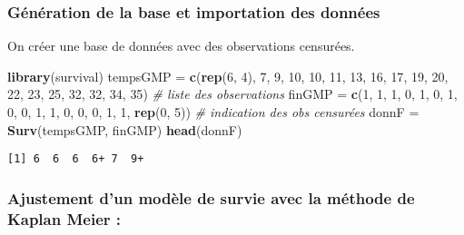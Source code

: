 \documentclass[
]{article}
\newenvironment{Shaded}{\begin{snugshade}}{\end{snugshade}}
\newcommand{\CommentTok}[1]{\textcolor[rgb]{0.56,0.35,0.01}{\textit{#1}}}
\newcommand{\DecValTok}[1]{\textcolor[rgb]{0.00,0.00,0.81}{#1}}
\newcommand{\FunctionTok}[1]{\textcolor[rgb]{0.13,0.29,0.53}{\textbf{#1}}}
\newcommand{\NormalTok}[1]{#1}
\newcommand{\OtherTok}[1]{\textcolor[rgb]{0.56,0.35,0.01}{#1}}
\begin{document}
\hypertarget{guxe9nuxe9ration-de-la-base-et-importation-des-donnuxe9es}{%
\subsubsection{Génération de la base et importation des
données}\label{guxe9nuxe9ration-de-la-base-et-importation-des-donnuxe9es}}

On créer une base de données avec des observations censurées.

\begin{Shaded}
\begin{Highlighting}[]
\FunctionTok{library}\NormalTok{(survival)}
\NormalTok{tempsGMP }\OtherTok{=} \FunctionTok{c}\NormalTok{(}\FunctionTok{rep}\NormalTok{(}\DecValTok{6}\NormalTok{, }\DecValTok{4}\NormalTok{), }\DecValTok{7}\NormalTok{, }\DecValTok{9}\NormalTok{, }\DecValTok{10}\NormalTok{, }\DecValTok{10}\NormalTok{, }\DecValTok{11}\NormalTok{, }\DecValTok{13}\NormalTok{, }\DecValTok{16}\NormalTok{, }\DecValTok{17}\NormalTok{, }\DecValTok{19}\NormalTok{, }\DecValTok{20}\NormalTok{, }\DecValTok{22}\NormalTok{, }\DecValTok{23}\NormalTok{, }\DecValTok{25}\NormalTok{, }\DecValTok{32}\NormalTok{, }
             \DecValTok{32}\NormalTok{, }\DecValTok{34}\NormalTok{, }\DecValTok{35}\NormalTok{) }\CommentTok{\# liste des observations}
\NormalTok{finGMP }\OtherTok{=} \FunctionTok{c}\NormalTok{(}\DecValTok{1}\NormalTok{, }\DecValTok{1}\NormalTok{, }\DecValTok{1}\NormalTok{, }\DecValTok{0}\NormalTok{, }\DecValTok{1}\NormalTok{, }\DecValTok{0}\NormalTok{, }\DecValTok{1}\NormalTok{, }\DecValTok{0}\NormalTok{, }\DecValTok{0}\NormalTok{, }\DecValTok{1}\NormalTok{, }\DecValTok{1}\NormalTok{, }\DecValTok{0}\NormalTok{, }\DecValTok{0}\NormalTok{, }\DecValTok{0}\NormalTok{, }\DecValTok{1}\NormalTok{, }\DecValTok{1}\NormalTok{, }\FunctionTok{rep}\NormalTok{(}\DecValTok{0}\NormalTok{, }\DecValTok{5}\NormalTok{)) }
\CommentTok{\# indication des obs censurées}
\NormalTok{donnF }\OtherTok{=} \FunctionTok{Surv}\NormalTok{(tempsGMP, finGMP) }
\FunctionTok{head}\NormalTok{(donnF)}
\end{Highlighting}
\end{Shaded}

\begin{verbatim}
[1] 6  6  6  6+ 7  9+
\end{verbatim}

\hypertarget{ajustement-dun-moduxe8le-de-survie-avec-la-muxe9thode-de-kaplan-meier}{%
\subsubsection{Ajustement d'un modèle de survie avec la méthode de
Kaplan Meier
:}\label{ajustement-dun-moduxe8le-de-survie-avec-la-muxe9thode-de-kaplan-meier}}
\end{document}
